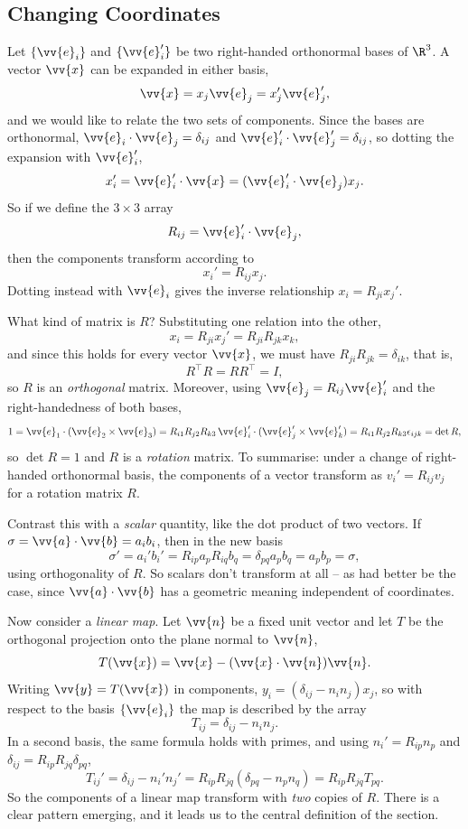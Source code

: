 \subsection{Changing Coordinates}

Let $\{\vv{e}_i\}$ and $\{\vv{e}_i'\}$ be two right-handed orthonormal bases of $\R^3$. A vector $\vv{x}$ can be expanded in either basis,
$$
\vv{x} = x_j \vv{e}_j = x_j' \vv{e}_j',
$$
and we would like to relate the two sets of components. Since the bases are orthonormal, $\vv{e}_i \cdot \vv{e}_j = \delta_{ij}$ and $\vv{e}_i' \cdot \vv{e}_j' = \delta_{ij}$, so dotting the expansion with $\vv{e}_i'$,
$$
x_i' = \vv{e}_i' \cdot \vv{x} = (\vv{e}_i' \cdot \vv{e}_j) x_j.
$$
So if we define the $3 \times 3$ array
$$
R_{ij} = \vv{e}_i' \cdot \vv{e}_j,
$$
then the components transform according to
$$
x_i' = R_{ij} x_j.
$$
Dotting instead with $\vv{e}_i$ gives the inverse relationship $x_i = R_{ji} x_j'$.

What kind of matrix is $R$? Substituting one relation into the other,
$$
x_i = R_{ji} x_j' = R_{ji} R_{jk} x_k,
$$
and since this holds for every vector $\vv{x}$, we must have $R_{ji}R_{jk} = \delta_{ik}$, that is,
$$
R^\top R = R R^\top = I,
$$
so $R$ is an \emph{orthogonal} matrix. Moreover, using $\vv{e}_j = R_{ij}\vv{e}_i'$ and the right-handedness of both bases,
$$
1 = \vv{e}_1 \cdot (\vv{e}_2 \times \vv{e}_3) = R_{i1}R_{j2}R_{k3} \, \vv{e}_i' \cdot (\vv{e}_j' \times \vv{e}_k') = R_{i1}R_{j2}R_{k3} \epsilon_{ijk} = \det R,
$$
so $\det R = 1$ and $R$ is a \emph{rotation} matrix. To summarise: under a change of right-handed orthonormal basis, the components of a vector transform as $v_i' = R_{ij} v_j$ for a rotation matrix $R$.

Contrast this with a \emph{scalar} quantity, like the dot product of two vectors. If $\sigma = \vv{a} \cdot \vv{b} = a_i b_i$, then in the new basis
$$
\sigma' = a_i' b_i' = R_{ip} a_p R_{iq} b_q = \delta_{pq} a_p b_q = a_p b_p = \sigma,
$$
using orthogonality of $R$. So scalars don't transform at all -- as had better be the case, since $\vv{a} \cdot \vv{b}$ has a geometric meaning independent of coordinates.

Now consider a \emph{linear map}. Let $\vv{n}$ be a fixed unit vector and let $T$ be the orthogonal projection onto the plane normal to $\vv{n}$,
$$
T(\vv{x}) = \vv{x} - (\vv{x} \cdot \vv{n}) \vv{n}.
$$
Writing $\vv{y} = T(\vv{x})$ in components, $y_i = (\delta_{ij} - n_i n_j) x_j$, so with respect to the basis $\{\vv{e}_i\}$ the map is described by the array
$$
T_{ij} = \delta_{ij} - n_i n_j.
$$
In a second basis, the same formula holds with primes, and using $n_i' = R_{ip} n_p$ and $\delta_{ij} = R_{ip}R_{jq}\delta_{pq}$,
$$
T_{ij}' = \delta_{ij} - n_i' n_j' = R_{ip} R_{jq} (\delta_{pq} - n_p n_q) = R_{ip} R_{jq} T_{pq}.
$$
So the components of a linear map transform with \emph{two} copies of $R$. There is a clear pattern emerging, and it leads us to the central definition of the section.

